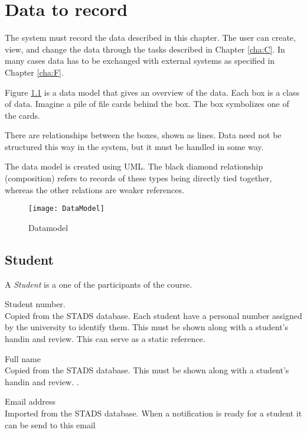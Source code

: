 \documentclass[Main]{subfiles}
\begin{document}
\chapter{Data to record}
The system must record the data described in this chapter. The user can create, view, and change the data through the tasks described in Chapter \ref{cha:C}. 
In many cases data has to be exchanged with external systems as specified in Chapter \ref{cha:F}.

Figure \ref{fig:Datamodel} is a data model that gives an overview of the data. 
Each box is a class of data. 
Imagine a pile of file cards behind the box. 
The box symbolizes one of the cards. 

There are relationships between the boxes, shown as lines.
Data need not be structured this way in the system, but it must be handled in some way. 

The data model is created using UML. The black diamond relationship (composition) refers to records of these types being directly tied together, whereas the other relations are weaker references. 

\begin{figure}[hbtp]
\centering
\texttt{[image: DataModel]}
\caption{Datamodel}
\label{fig:Datamodel}
\end{figure}


\newpage

\section{Student}
A \textit{Student} is a one of the participants of the course.
\begin{DataIntro}
\rExample{}
\end{DataIntro}

\begin{DataTable}

\Record
{Student number. 
\\
Copied from the STADS database. Each student have a personal number assigned by the university to identify them. This must be shown along with a student's handin and review. }
{This can serve as a static reference.}
{}

\Record
{Full name\\
Copied from the STADS database.
This must be shown along with a student's handin and review.}
{.}
{}

\Record
{Email address\\
Imported from the STADS database.}
{When a notification is ready for a student it can be send to this email}
{}
\end{DataTable}
\end{document}
